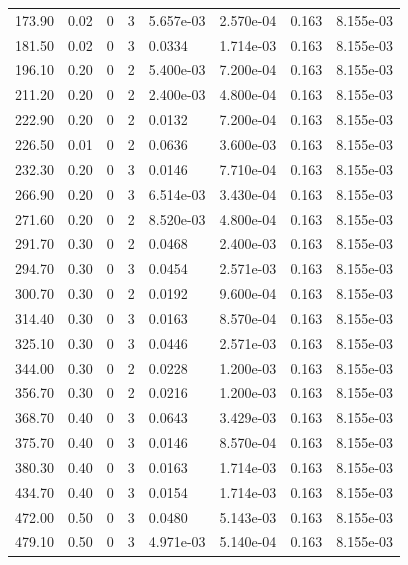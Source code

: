 \documentclass[preview]{standalone}
\begin{document}
{{\begin{tabular}{L{1.2cm}C{1.2cm} C{0.3cm}C{0.5cm} C{1.4cm}C{1.4cm} C{1.4cm}C{1.4cm}}
  173.90  &  0.02  & 0     &  3 &  5.657e-03  & 2.570e-04  & 0.163 &  8.155e-03   \\ 
  181.50  &  0.02  & 0     &  3 &  0.0334  & 1.714e-03  & 0.163 &  8.155e-03   \\ 
  196.10  &  0.20  & 0     &  2 &  5.400e-03  & 7.200e-04  & 0.163 &  8.155e-03   \\ 
  211.20  &  0.20  & 0     &  2 &  2.400e-03  & 4.800e-04  & 0.163 &  8.155e-03   \\ 
  222.90  &  0.20  & 0     &  2 &  0.0132  & 7.200e-04  & 0.163 &  8.155e-03   \\ 
  226.50  &  0.01  & 0     &  2 &  0.0636  & 3.600e-03  & 0.163 &  8.155e-03   \\ 
  232.30  &  0.20  & 0     &  3 &  0.0146  & 7.710e-04  & 0.163 &  8.155e-03   \\ 
  266.90  &  0.20  & 0     &  3 &  6.514e-03  & 3.430e-04  & 0.163 &  8.155e-03   \\ 
  271.60  &  0.20  & 0     &  2 &  8.520e-03  & 4.800e-04  & 0.163 &  8.155e-03   \\ 
  291.70  &  0.30  & 0     &  2 &  0.0468  & 2.400e-03  & 0.163 &  8.155e-03   \\ 
  294.70  &  0.30  & 0     &  3 &  0.0454  & 2.571e-03  & 0.163 &  8.155e-03   \\ 
  300.70  &  0.30  & 0     &  2 &  0.0192  & 9.600e-04  & 0.163 &  8.155e-03   \\ 
  314.40  &  0.30  & 0     &  3 &  0.0163  & 8.570e-04  & 0.163 &  8.155e-03   \\ 
  325.10  &  0.30  & 0     &  3 &  0.0446  & 2.571e-03  & 0.163 &  8.155e-03   \\ 
  344.00  &  0.30  & 0     &  2 &  0.0228  & 1.200e-03  & 0.163 &  8.155e-03   \\ 
  356.70  &  0.30  & 0     &  2 &  0.0216  & 1.200e-03  & 0.163 &  8.155e-03   \\ 
  368.70  &  0.40  & 0     &  3 &  0.0643  & 3.429e-03  & 0.163 &  8.155e-03   \\ 
  375.70  &  0.40  & 0     &  3 &  0.0146  & 8.570e-04  & 0.163 &  8.155e-03   \\ 
  380.30  &  0.40  & 0     &  3 &  0.0163  & 1.714e-03  & 0.163 &  8.155e-03   \\ 
  434.70  &  0.40  & 0     &  3 &  0.0154  & 1.714e-03  & 0.163 &  8.155e-03   \\ 
  472.00  &  0.50  & 0     &  3 &  0.0480  & 5.143e-03  & 0.163 &  8.155e-03   \\ 
  479.10  &  0.50  & 0     &  3 &  4.971e-03  & 5.140e-04  & 0.163 &  8.155e-03   \\ 

\end{tabular}}}
\end{document}
